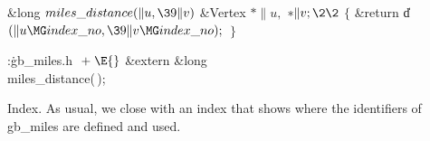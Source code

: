 \Y\B\1\1\&{long} ${}\\{miles\_distance}(\|u,\39\|v){}$\6
\&{Vertex} ${}{*}\|u,{}$ ${}{*}\|v;\2\2{}$\6
${}\{{}$\1\6
\&{return} \|d${}(\|u\MG\\{index\_no},\39\|v\MG\\{index\_no});{}$\6
\4${}\}{}$\2\par
\fi

\B{}:\.{gb\_miles.h }\X${}\mathrel+\E{}$\6
\&{extern} \&{long} \\{miles\_distance}(\,);\par
\fi

Index. As usual, we close with an index that
shows where the identifiers of \\{gb\_miles} are defined and used.
\fi

\inx
\fin
\con
